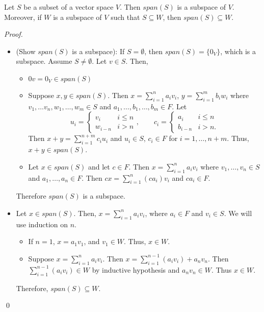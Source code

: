 \documentclass[12pt]{article}
\newenvironment{theorem}[2][Theorem]{\begin{trivlist}
\item[\hskip \labelsep {\bfseries #1}\hskip \labelsep {\bfseries #2.}]}{\end{trivlist}}
\newenvironment{sol}
    {\emph{Proof.}
    }
    {
    \qed
    }
\begin{document}
\begin{theorem}{1.5}
Let $S$ be a subset of a vector space $V$. Then $span(S)$ is a subspace of $V$. Moreover, if $W$ is a subspace of $V$ such that $S \subseteq W$, then $span(S) \subseteq W$.
\end{theorem}

\begin{sol}
\begin{itemize}
    \item[(1)] (Show $span(S)$ is a subspace): If $S = \emptyset$, then $span(S) = \{0_V\}$, which is a subspace. Assume $S \neq \emptyset$. Let $v \in S$. Then,
    \begin{itemize}
        \item[(a)] $0v = 0_V \in span(S)$
        \item[(b)] Suppose $x,y \in span(S)$. Then $x = \sum_{i = 1}^na_iv_i$, $y = \sum_{i = 1}^mb_iw_i$ where \\ $v_1, \dots v_n, w_1, \dots, w_m \in S$ and $a_1, \dots, b_1, \dots, b_m \in F$. Let 
        $$u_i = 
        \begin{cases} 
            v_i & i \leq n \\
            w_{i-n} & i > n
        \end{cases}, \hspace{2em}
        c_i = 
        \begin{cases} 
            a_i & i \leq n \\
            b_{i-n} & i > n.
        \end{cases}$$
        Then $x + y = \sum_{i = 1}^{n + m}c_iu_i$ and $u_i \in S$, $c_i \in F$ for $i = 1, \dots, n + m$. Thus, $x + y \in span(S)$.
        \item[(c)] Let $x \in span(S)$ and let $c \in F$. Then $x = \sum_{i = 1}^na_iv_i$ where $v_1, \dots, v_n \in S$ and $a_1, \dots, a_n \in F$. Then $cx = \sum_{i = 1}^n(ca_i)v_i$ and $ca_i \in F$.
    \end{itemize}
    Therefore $span(S)$ is a subspace.
    \item[(2)] Let $x \in span(S)$. Then, $x = \sum_{i = 1}^na_iv_i$, where $a_i \in F$ and $v_i \in S$. We will use induction on $n$.
    \begin{itemize}
        \item If $n = 1$, $x = a_1v_1$, and $v_1 \in W$. Thus, $x \in W$.
        \item Suppose $x = \sum_{i = 1}^na_iv_i$. Then $x = \sum_{i = 1}^{n - 1}(a_iv_i) + a_nv_n$. Then $\sum_{i = 1}^{n - 1}(a_iv_i) \in W$ by inductive hypothesis and $a_nv_n \in W$. Thus $x \in W$.
    \end{itemize}
    Therefore, $span(S) \subseteq W$.
\end{itemize}
\end{sol}
\end{document}
